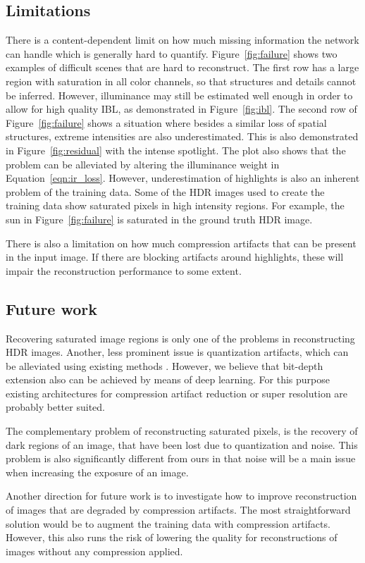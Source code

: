 \documentclass[acmtog]{acmart}
\newcommand{\figref}[1]{Figure~\ref{fig:#1}}
\newcommand{\eqnref}[1]{Equation~\ref{eqn:#1}}
\newcommand\customsection[1]{\subsection{#1}}
\begin{document}
\customsection{Limitations} There is a content-dependent limit on how much missing information the network can handle which is generally hard to quantify. \figref{failure} shows two examples of difficult scenes that are hard to reconstruct. The first row has a large region with saturation in all color channels, so that structures and details cannot be inferred. However, illuminance may still be estimated well enough in order to allow for high quality IBL, as demonstrated in \figref{ibl}. The second row of \figref{failure} shows a situation where besides a similar loss of spatial structures, extreme intensities are also underestimated. This is also demonstrated in \figref{residual} with the intense spotlight. The plot also shows that the problem can be alleviated by altering the illuminance weight  in \eqnref{ir_loss}. However, underestimation of highlights is also an inherent problem of the training data. 
Some of the HDR images used to create the training data show saturated pixels in high intensity regions. For example, the sun in \figref{failure} is saturated in the ground truth HDR image.

There is also a limitation on how much compression artifacts that can be present in the input image. If there are blocking artifacts around highlights, these will impair the reconstruction performance to some extent.

\customsection{Future work} Recovering saturated image regions is only one of the problems in reconstructing HDR images. Another, less prominent issue is quantization artifacts, which can be alleviated using existing methods \cite{Daly2003}. However, we believe that bit-depth extension also can be achieved by means of deep learning. For this purpose existing architectures for compression artifact reduction \cite{Svoboda2016} or super resolution \cite{Ledig2016} are probably better suited.

The complementary problem of reconstructing saturated pixels, is the recovery of dark regions of an image, that have been lost due to quantization and noise. This problem is also significantly different from ours in that noise will be a main issue when increasing the exposure of an image.

Another direction for future work is to investigate how to improve reconstruction of images that are degraded by compression artifacts. The most straightforward solution would be to augment the training data with compression artifacts. However, this also runs the risk of lowering the quality for reconstructions of images without any compression applied.
\end{document}
